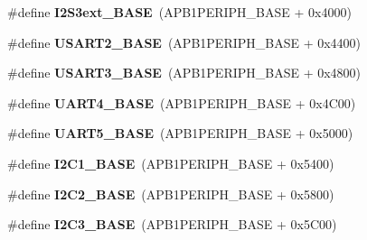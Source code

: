 \begin{DoxyCompactItemize}
\item 
\hypertarget{group___peripheral__memory__map_ga89b61d6e6b09e94f3fccb7bef34e0263}{\#define {\bfseries I2\-S3ext\-\_\-\-B\-A\-S\-E}~(A\-P\-B1\-P\-E\-R\-I\-P\-H\-\_\-\-B\-A\-S\-E + 0x4000)}\label{group___peripheral__memory__map_ga89b61d6e6b09e94f3fccb7bef34e0263}

\item 
\hypertarget{group___peripheral__memory__map_gade83162a04bca0b15b39018a8e8ec090}{\#define {\bfseries U\-S\-A\-R\-T2\-\_\-\-B\-A\-S\-E}~(A\-P\-B1\-P\-E\-R\-I\-P\-H\-\_\-\-B\-A\-S\-E + 0x4400)}\label{group___peripheral__memory__map_gade83162a04bca0b15b39018a8e8ec090}

\item 
\hypertarget{group___peripheral__memory__map_gabe0d6539ac0026d598274ee7f45b0251}{\#define {\bfseries U\-S\-A\-R\-T3\-\_\-\-B\-A\-S\-E}~(A\-P\-B1\-P\-E\-R\-I\-P\-H\-\_\-\-B\-A\-S\-E + 0x4800)}\label{group___peripheral__memory__map_gabe0d6539ac0026d598274ee7f45b0251}

\item 
\hypertarget{group___peripheral__memory__map_ga94d92270bf587ccdc3a37a5bb5d20467}{\#define {\bfseries U\-A\-R\-T4\-\_\-\-B\-A\-S\-E}~(A\-P\-B1\-P\-E\-R\-I\-P\-H\-\_\-\-B\-A\-S\-E + 0x4\-C00)}\label{group___peripheral__memory__map_ga94d92270bf587ccdc3a37a5bb5d20467}

\item 
\hypertarget{group___peripheral__memory__map_gaa155689c0e206e6994951dc3cf31052a}{\#define {\bfseries U\-A\-R\-T5\-\_\-\-B\-A\-S\-E}~(A\-P\-B1\-P\-E\-R\-I\-P\-H\-\_\-\-B\-A\-S\-E + 0x5000)}\label{group___peripheral__memory__map_gaa155689c0e206e6994951dc3cf31052a}

\item 
\hypertarget{group___peripheral__memory__map_gacd72dbffb1738ca87c838545c4eb85a3}{\#define {\bfseries I2\-C1\-\_\-\-B\-A\-S\-E}~(A\-P\-B1\-P\-E\-R\-I\-P\-H\-\_\-\-B\-A\-S\-E + 0x5400)}\label{group___peripheral__memory__map_gacd72dbffb1738ca87c838545c4eb85a3}

\item 
\hypertarget{group___peripheral__memory__map_ga04bda70f25c795fb79f163b633ad4a5d}{\#define {\bfseries I2\-C2\-\_\-\-B\-A\-S\-E}~(A\-P\-B1\-P\-E\-R\-I\-P\-H\-\_\-\-B\-A\-S\-E + 0x5800)}\label{group___peripheral__memory__map_ga04bda70f25c795fb79f163b633ad4a5d}

\item 
\hypertarget{group___peripheral__memory__map_ga4e8b9198748235a1729e1e8f8f24983b}{\#define {\bfseries I2\-C3\-\_\-\-B\-A\-S\-E}~(A\-P\-B1\-P\-E\-R\-I\-P\-H\-\_\-\-B\-A\-S\-E + 0x5\-C00)}\label{group___peripheral__memory__map_ga4e8b9198748235a1729e1e8f8f24983b}


\end{DoxyCompactItemize}
